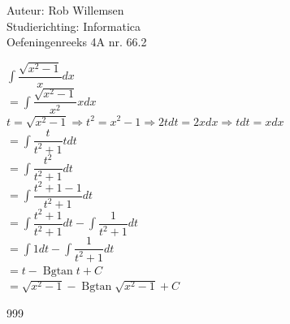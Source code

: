 \documentclass[a4paper]{article}
\newcommand{\dint}{\displaystyle\int}
\newcommand{\Bgtan}{\operatorname{Bgtan}}
\begin{document}
\noindent \large Auteur: Rob Willemsen \\
\noindent \large Studierichting: Informatica \\
\noindent \large Oefeningenreeks 4A nr. 66.2 \\

\medskip

\normalsize

$\dint \dfrac{\sqrt{x^2-1}}{x}dx$ \\

$= \dint \dfrac{\sqrt{x^2-1}}{x^2} xdx$ \\

$t = \sqrt{x^2-1} \Rightarrow t^2 = x^2 - 1 \Rightarrow 2tdt = 2xdx \Rightarrow tdt = xdx$ \\

$= \dint \dfrac{t}{t^2+1} tdt$ \\

$= \dint \dfrac{t^2}{t^2+1} dt$ \\

$= \dint \dfrac{t^2+1-1}{t^2+1} dt$ \\

$= \dint \dfrac{t^2+1}{t^2+1} dt - \dint \dfrac{1}{t^2+1} dt$ \\

$= \dint 1 dt - \dint \dfrac{1}{t^2+1} dt$ \\

$= t - \Bgtan t + C$ \\

$= \sqrt{x^2-1} - \Bgtan \sqrt{x^2-1} + C$ \\

\begin{thebibliography}{999}
\end{thebibliography}
\end{document}
